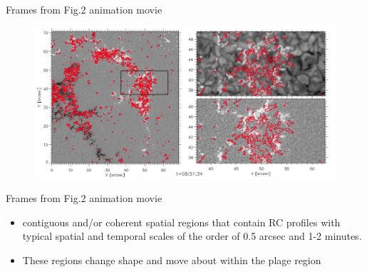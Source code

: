 \documentclass{beamer}
\begin{document}
\begin{frame}{Frames from Fig.2 animation movie}
\begin{figure}[H]
 \centering
 \includegraphics[scale=0.28]{output009.jpg}
\end{figure}

\end{frame}

\begin{frame}{Frames from Fig.2 animation movie}
\begin{itemize}
\item contiguous and/or coherent spatial regions
that contain RC profiles with typical spatial and temporal scales
of the order of 0.5 arcsec and 1-2 minutes. 
\item These regions change shape
and move about within the plage region
\end{itemize}
\end{frame}
\end{document}
